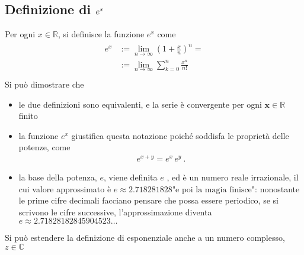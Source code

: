 \documentclass[letterpaper,10pt,english]{jupyterBook}
\begin{document}
\subsection{Definizione di \protect\(e^x\protect\)}
\label{\detokenize{ch/exponential_logarithm:definizione-di-e-x}}
\sphinxAtStartPar
{} Per ogni \(x \in \mathbb{R}\), si definisce la funzione \(e^x\) come
\begin{equation*}
\begin{split}\begin{aligned}
e^x & := \lim_{n \rightarrow \infty} \left( 1 + \frac{x}{n}\right)^n  = \\
    & := \lim_{n \rightarrow \infty} \sum_{k=0}^{n} \frac{x^n}{n!} \\
\end{aligned}\end{split}
\end{equation*}
\sphinxAtStartPar
Si può dimostrare che
\begin{itemize}
\item {} 
\sphinxAtStartPar
le due definizioni sono equivalenti, e la serie è convergente per ogni \(\mathbf{x} \in \mathbb{R}\) finito

\item {} 
\sphinxAtStartPar
la funzione \(e^x\) giustifica questa notazione poiché soddisfa le proprietà delle potenze, come
\begin{equation*}
\begin{split}e^{x+y} = e^x \, e^y \ .\end{split}
\end{equation*}
\item {} 
\sphinxAtStartPar
la base della potenza, \(e\), viene definita \(e\) , ed è un numero reale irrazionale, il cui valore approssimato è \(e \approx 2.718281828\text{"e poi la magia finisce"}\): nonostante le prime cifre decimali facciano pensare che possa essere periodico, se si scrivono le cifre successive, l’approssimazione diventa \(e \approx 2.71828182845904523\dots\)

\end{itemize}

\sphinxAtStartPar
{} Si può estendere la definizione di esponenziale anche a un numero complesso, \(z \in \mathbb{C}\)

\sphinxstepscope
\end{document}
